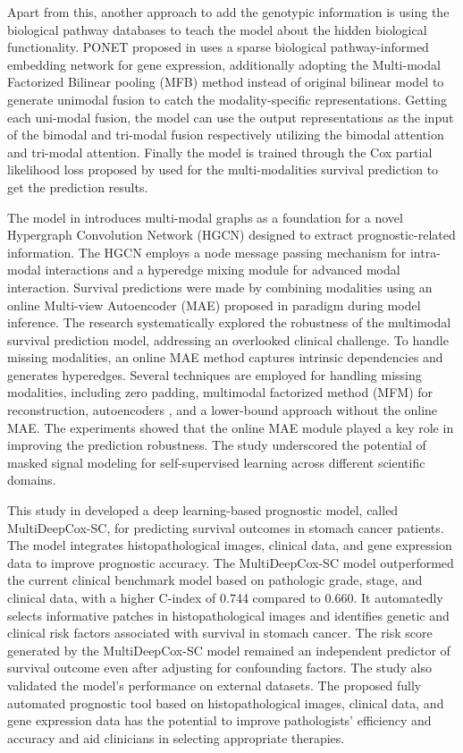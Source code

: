 \documentclass[journal,twoside,web]{ieeecolor}
\begin{document}
Apart from this, another approach to add the genotypic information is using the biological pathway databases to teach the model about the hidden biological functionality.
PONET proposed in \cite{qiu2023deep} uses a sparse biological pathway-informed embedding network for gene expression, additionally adopting the Multi-modal Factorized Bilinear pooling (MFB) method instead of original bilinear model to generate unimodal fusion to catch the modality-specific representations.
Getting each uni-modal fusion, the model can use the output representations as the input of the bimodal and tri-modal fusion respectively utilizing the bimodal attention and tri-modal attention.
Finally the model is trained through the Cox partial likelihood loss proposed by \cite{cheerla2019deep} used for the multi-modalities survival prediction to get the prediction results.

The model in \cite{hou2023hybrid} introduces multi-modal graphs as a foundation for a novel Hypergraph Convolution Network (HGCN) designed to extract prognostic-related information. 
The HGCN employs a node message passing mechanism for intra-modal interactions and a hyperedge mixing module for advanced modal interaction. 
Survival predictions were made by combining modalities using an online Multi-view Autoencoder (MAE) proposed in \cite{he2022masked} paradigm during model inference.
The research systematically explored the robustness of the multimodal survival prediction model, addressing an overlooked clinical challenge. 
To handle missing modalities, an online MAE method captures intrinsic dependencies and generates hyperedges. 
Several techniques are employed for handling missing modalities, including zero padding, multimodal factorized method (MFM) for reconstruction, autoencoders \cite{tran2017missing} \cite{liu2021incomplete}, and a lower-bound approach without the online MAE.
The experiments showed that the online MAE module played a key role in improving the prediction robustness.
The study underscored the potential of masked signal modeling for self-supervised learning across different scientific domains.

This study in \cite{wei2023survival} developed a deep learning-based prognostic model, called MultiDeepCox-SC, for predicting survival outcomes in stomach cancer patients. 
The model integrates histopathological images, clinical data, and gene expression data to improve prognostic accuracy. 
The MultiDeepCox-SC model outperformed the current clinical benchmark model based on pathologic grade, stage, and clinical data, with a higher C-index of 0.744 compared to 0.660. 
It automatedly selects informative patches in histopathological images and identifies genetic and clinical risk factors associated with survival in stomach cancer. 
The risk score generated by the MultiDeepCox-SC model remained an independent predictor of survival outcome even after adjusting for confounding factors. 
The study also validated the model's performance on external datasets. 
The proposed fully automated prognostic tool based on histopathological images, clinical data, and gene expression data has the potential to improve pathologists' efficiency and accuracy and aid clinicians in selecting appropriate therapies. 
\end{document}
